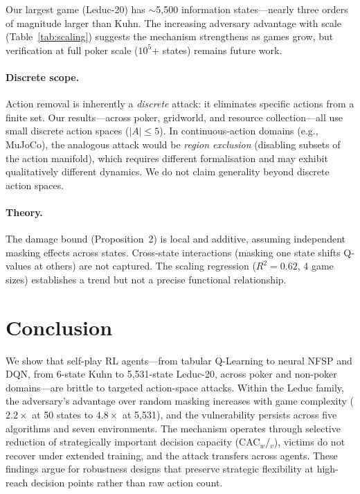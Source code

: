\documentclass{article}
\begin{document}
Our largest game (Leduc-20) has $\sim$5,500 information states---nearly three orders of magnitude larger than Kuhn. The increasing adversary advantage with scale (Table~\ref{tab:scaling}) suggests the mechanism strengthens as games grow, but verification at full poker scale ($10^5$+ states) remains future work.

\paragraph{Discrete scope.}
Action removal is inherently a \emph{discrete} attack: it eliminates specific actions from a finite set. Our results---across poker, gridworld, and resource collection---all use small discrete action spaces ($|A| \leq 5$). In continuous-action domains (e.g., MuJoCo), the analogous attack would be \emph{region exclusion} (disabling subsets of the action manifold), which requires different formalisation and may exhibit qualitatively different dynamics. We do not claim generality beyond discrete action spaces.

\paragraph{Theory.}
The damage bound (Proposition~2) is local and additive, assuming independent masking effects across states. Cross-state interactions (masking one state shifts Q-values at others) are not captured. The scaling regression ($R^2 = 0.62$, 4 game sizes) establishes a trend but not a precise functional relationship.

\section{Conclusion}

We show that self-play RL agents---from tabular Q-Learning to neural NFSP and DQN, from 6-state Kuhn to 5,531-state Leduc-20, across poker and non-poker domains---are brittle to targeted action-space attacks. Within the Leduc family, the adversary's advantage over random masking increases with game complexity ($2.2\times$ at 50 states to $4.8\times$ at 5,531), and the vulnerability persists across five algorithms and seven environments. The mechanism operates through selective reduction of strategically important decision capacity (CAC$_w$/$_v$), victims do not recover under extended training, and the attack transfers across agents. These findings argue for robustness designs that preserve strategic flexibility at high-reach decision points rather than raw action count.
\end{document}
